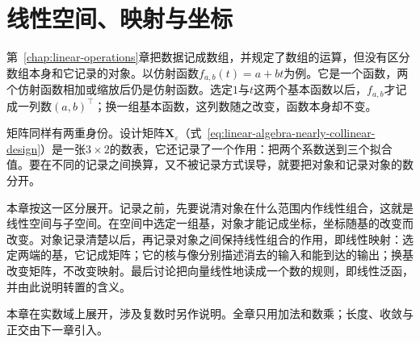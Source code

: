 \chapter{线性空间、映射与坐标}
\label{chap:linear-representation}
\label{chap:linear-algebra-and-matrix-analysis}
\label{chap:linear-algebra}

第~\ref{chap:linear-operations}章把数据记成数组，并规定了数组的运算，但没有区分数组本身和它记录的对象。以仿射函数$f_{a,b}(t)=a+bt$为例。它是一个函数，两个仿射函数相加或缩放后仍是仿射函数。选定$1$与$t$这两个基本函数以后，$f_{a,b}$才记成一列数$(a,b)^{\top}$；换一组基本函数，这列数随之改变，函数本身却不变。

矩阵同样有两重身份。设计矩阵$\bm X_\varepsilon$（式~\eqref{eq:linear-algebra-nearly-collinear-design}）是一张$3\times2$的数表，它还记录了一个作用：把两个系数送到三个拟合值。要在不同的记录之间换算，又不被记录方式误导，就要把对象和记录对象的数分开。

本章按这一区分展开。记录之前，先要说清对象在什么范围内作线性组合，这就是线性空间与子空间。在空间中选定一组基，对象才能记成坐标，坐标随基的改变而改变。对象记录清楚以后，再记录对象之间保持线性组合的作用，即线性映射：选定两端的基，它记成矩阵；它的核与像分别描述消去的输入和能到达的输出；换基改变矩阵，不改变映射。最后讨论把向量线性地读成一个数的规则，即线性泛函，并由此说明转置的含义。

本章在实数域上展开，涉及复数时另作说明。全章只用加法和数乘；长度、收敛与正交由下一章引入。






